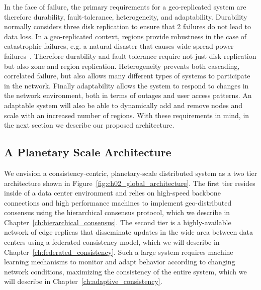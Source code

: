 In the face of failure, the primary requirements for a geo-replicated system are therefore durability, fault-tolerance, heterogeneity, and adaptability.
Durability normally considers three disk replication to ensure that 2 failures do not lead to data loss.
In a geo-replicated context, regions provide robustness in the case of catastrophic failures, e.g. a natural disaster that causes wide-spread power failures~\cite{cloud_deployments}.
Therefore durability and fault tolerance require not just disk replication but also zone and region replication.
Heterogeneity prevents both cascading, correlated failure, but also allows many different types of systems to participate in the network.
Finally adaptability allows the system to respond to changes in the network environment, both in terms of outages and user access patterns.
An adaptable system will also be able to dynamically add and remove nodes and scale with an increased number of regions.
With these requirements in mind, in the next section we describe our proposed architecture.

\subsection{A Planetary Scale Architecture}

We envision a consistency-centric, planetary-scale distributed system as a two tier architecture shown in Figure~\ref{fig:ch02_global_architecture}.
The first tier resides inside of a data center environment and relies on high-speed backbone connections and high performance machines to implement geo-distributed consensus using the hierarchical consensus protocol, which we describe in Chapter~\ref{ch:hierarchical_consensus}.
The second tier is a highly-available network of edge replicas that disseminate updates in the wide area between data centers using a federated consistency model, which we will describe in Chapter~\ref{ch:federated_consistency}.
Such a large system requires machine learning mechanisms to monitor and adapt behavior according to changing network conditions, maximizing the consistency of the entire system, which we will describe in Chapter~\ref{ch:adaptive_consistency}.

